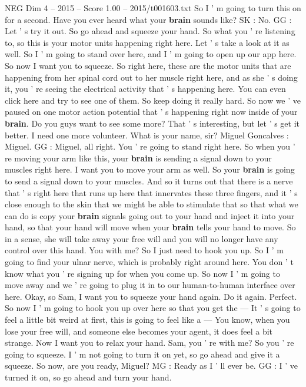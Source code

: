 \begin{textsample}{NEG Dim 4 – 2015 – Score 1.00 – 2015/t001603.txt}
So I ' m going to turn this on for a second.
Have you ever heard what your \textbf{brain} sounds like?
SK : No.
GG : Let ' s try it out.
So go ahead and squeeze your hand.
So what you ' re listening to, so this is your motor units happening right here.
Let ' s take a look at it as well.
So I ' m going to stand over here, and I ' m going to open up our app here.
So now I want you to squeeze.
So right here, these are the motor units that are happening from her spinal cord out to her muscle right here, and as she ' s doing it, you ' re seeing the electrical activity that ' s happening here.
You can even click here and try to see one of them.
So keep doing it really hard.
So now we ' ve paused on one motor action potential that ' s happening right now inside of your \textbf{brain}.
Do you guys want to see some more?
That ' s interesting, but let ' s get it better.
I need one more volunteer.
What is your name, sir?
Miguel Goncalves : Miguel.
GG : Miguel, all right.
You ' re going to stand right here.
So when you ' re moving your arm like this, your \textbf{brain} is sending a signal down to your muscles right here.
I want you to move your arm as well.
So your \textbf{brain} is going to send a signal down to your muscles.
And so it turns out that there is a nerve that ' s right here that runs up here that innervates these three fingers, and it ' s close enough to the skin that we might be able to stimulate that so that what we can do is copy your \textbf{brain} signals going out to your hand and inject it into your hand, so that your hand will move when your \textbf{brain} tells your hand to move.
So in a sense, she will take away your free will and you will no longer have any control over this hand.
You with me?
So I just need to hook you up.
So I ' m going to find your ulnar nerve, which is probably right around here.
You don ' t know what you ' re signing up for when you come up.
So now I ' m going to move away and we ' re going to plug it in to our human-to-human interface over here.
Okay, so Sam, I want you to squeeze your hand again.
Do it again.
Perfect.
So now I ' m going to hook you up over here so that you get the — It ' s going to feel a little bit weird at first, this is going to feel like a — You know, when you lose your free will, and someone else becomes your agent, it does feel a bit strange.
Now I want you to relax your hand.
Sam, you ' re with me?
So you ' re going to squeeze.
I ' m not going to turn it on yet, so go ahead and give it a squeeze.
So now, are you ready, Miguel?
MG : Ready as I ' ll ever be.
GG : I ' ve turned it on, so go ahead and turn your hand.

\end{textsample}
